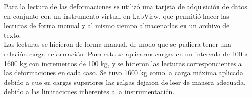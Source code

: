 Para la lectura de las deformaciones se utilizó una tarjeta de adquisición de datos en conjunto con 
un instrumento virtual en LabView\CR, que permitió hacer las lecturas de forma manual y al mismo tiempo 
almacenarlas en un archivo de texto. \\

Las lecturas se hicieron de forma manual, de modo que se pudiera tener una relación carga-deformación. 
Para esto se aplicaron cargas en un intervalo de 100 a 1600 kg con incrementos de 100 kg, y se hicieron 
las lecturas correspondientes a las deformaciones en cada caso. Se tuvo 1600 kg como la carga máxima 
aplicada debido a que en cargas superiores las galgas dejaron de leer de manera adecuada, debido a las 
limitaciones inherentes a la instrumentación.